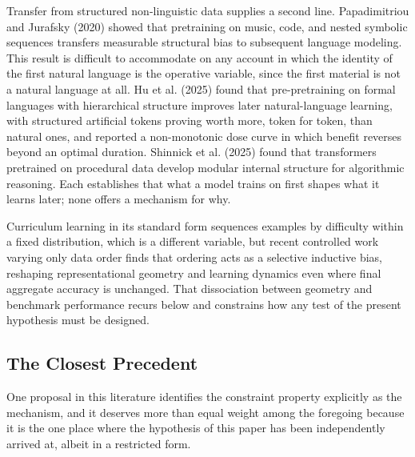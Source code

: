 \documentclass[11pt]{article}
\begin{document}
Transfer from structured non-linguistic data supplies a second line. Papadimitriou and Jurafsky (2020) showed that pretraining on music, code, and nested symbolic sequences transfers measurable structural bias to subsequent language modeling. This result is difficult to accommodate on any account in which the identity of the first natural language is the operative variable, since the first material is not a natural language at all. Hu et al. (2025) found that pre-pretraining on formal languages with hierarchical structure improves later natural-language learning, with structured artificial tokens proving worth more, token for token, than natural ones, and reported a non-monotonic dose curve in which benefit reverses beyond an optimal duration. Shinnick et al. (2025) found that transformers pretrained on procedural data develop modular internal structure for algorithmic reasoning. Each establishes that what a model trains on first shapes what it learns later; none offers a mechanism for why.

Curriculum learning in its standard form sequences examples by difficulty within a fixed distribution, which is a different variable, but recent controlled work varying only data order finds that ordering acts as a selective inductive bias, reshaping representational geometry and learning dynamics even where final aggregate accuracy is unchanged. That dissociation between geometry and benchmark performance recurs below and constrains how any test of the present hypothesis must be designed.

\subsection{The Closest Precedent}

One proposal in this literature identifies the constraint property explicitly as the mechanism, and it deserves more than equal weight among the foregoing because it is the one place where the hypothesis of this paper has been independently arrived at, albeit in a restricted form.
\end{document}
